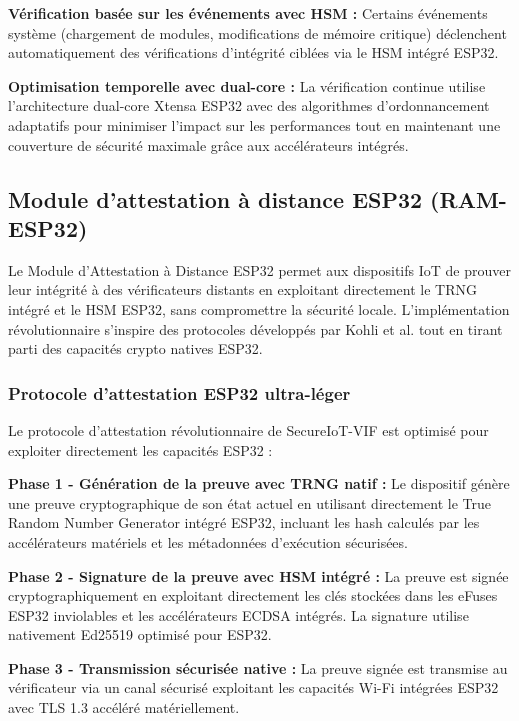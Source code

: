 \textbf{Vérification basée sur les événements avec HSM :} Certains événements système (chargement de modules, modifications de mémoire critique) déclenchent automatiquement des vérifications d'intégrité ciblées via le HSM intégré ESP32.

\textbf{Optimisation temporelle avec dual-core :} La vérification continue utilise l'architecture dual-core Xtensa ESP32 avec des algorithmes d'ordonnancement adaptatifs pour minimiser l'impact sur les performances tout en maintenant une couverture de sécurité maximale grâce aux accélérateurs intégrés.

\subsection{Module d'attestation à distance ESP32 (RAM-ESP32)}

Le Module d'Attestation à Distance ESP32 permet aux dispositifs IoT de prouver leur intégrité à des vérificateurs distants en exploitant directement le TRNG intégré et le HSM ESP32, sans compromettre la sécurité locale. L'implémentation révolutionnaire s'inspire des protocoles développés par Kohli et al. \cite{Kohli2024SwarmNet} tout en tirant parti des capacités crypto natives ESP32.

\subsubsection{Protocole d'attestation ESP32 ultra-léger}

Le protocole d'attestation révolutionnaire de SecureIoT-VIF est optimisé pour exploiter directement les capacités ESP32 :

\textbf{Phase 1 - Génération de la preuve avec TRNG natif :} Le dispositif génère une preuve cryptographique de son état actuel en utilisant directement le True Random Number Generator intégré ESP32, incluant les hash calculés par les accélérateurs matériels et les métadonnées d'exécution sécurisées.

\textbf{Phase 2 - Signature de la preuve avec HSM intégré :} La preuve est signée cryptographiquement en exploitant directement les clés stockées dans les eFuses ESP32 inviolables et les accélérateurs ECDSA intégrés. La signature utilise nativement Ed25519 optimisé pour ESP32.

\textbf{Phase 3 - Transmission sécurisée native :} La preuve signée est transmise au vérificateur via un canal sécurisé exploitant les capacités Wi-Fi intégrées ESP32 avec TLS 1.3 accéléré matériellement.


